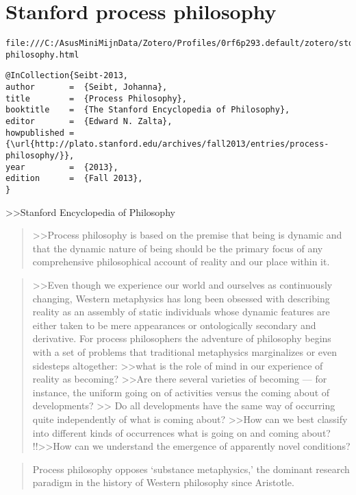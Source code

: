 \documentclass[a4paper]{Thesis}
\begin{document}
\section{Stanford process philosophy}
\begin{verbatim}
file:///C:/AsusMiniMijnData/Zotero/Profiles/0rf6p293.default/zotero/storage/TRSB7DQH/process-philosophy.html
\end{verbatim}


\begin{verbatim}
@InCollection{Seibt-2013,
author       =	{Seibt, Johanna},
title        =	{Process Philosophy},
booktitle    =	{The Stanford Encyclopedia of Philosophy},
editor       =	{Edward N. Zalta},
howpublished =	{\url{http://plato.stanford.edu/archives/fall2013/entries/process-philosophy/}},
year         =	{2013},
edition      =	{Fall 2013},
}
\end{verbatim}


>>Stanford Encyclopedia of Philosophy
\begin{quotation}
	>>Process philosophy is based on the premise that being is dynamic and that the dynamic nature of being should be the primary focus of any comprehensive philosophical account of reality and our place within it. 
\end{quotation}

\begin{quotation}
	>>Even though we experience our world and ourselves as continuously changing, Western metaphysics has long been obsessed with describing reality as an assembly of static individuals whose dynamic features are either taken to be mere appearances or ontologically secondary and derivative. 
	For process philosophers the adventure of philosophy begins with a set of problems that traditional metaphysics marginalizes or even sidesteps altogether: 
	>>what is the role of mind in our experience of reality as becoming? 
	>>Are there several varieties of becoming — for instance, the uniform going on of activities versus the coming about of developments? 
	>> Do all developments have the same way of occurring quite independently of what is coming about? 
	>>How can we best classify into different kinds of occurrences what is going on and coming about? 
	!!>>How can we understand the emergence of apparently novel conditions?
	
\end{quotation}

\begin{quotation}
	Process philosophy opposes ‘substance metaphysics,’ the dominant research paradigm in the history of Western philosophy since Aristotle.
\end{quotation}
\end{document}
